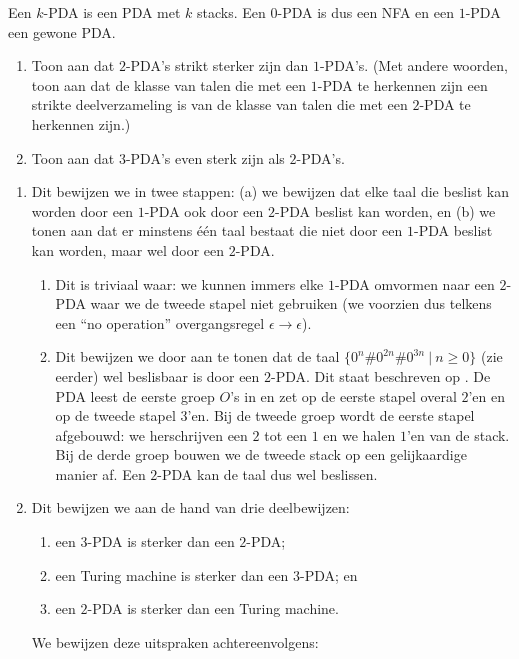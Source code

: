 \documentclass[a4paper]{article}
\begin{document}
\begin{question}
Een $k$-PDA is een PDA met $k$ stacks. Een $0$-PDA is dus een NFA en een $1$-PDA een gewone PDA. 
\begin{enumerate}
  \item Toon aan dat $2$-PDA's strikt sterker zijn dan $1$-PDA's. (Met andere woorden, toon aan dat de klasse van talen die met een $1$-PDA te herkennen zijn een strikte deelverzameling is van de klasse van talen die met een $2$-PDA te herkennen zijn.)
  \item Toon aan dat $3$-PDA's even sterk zijn als $2$-PDA's.
\end{enumerate}
\end{question}
\begin{answer}
\begin{enumerate}
\item Dit bewijzen we in twee stappen: (a) we bewijzen dat elke taal die beslist kan worden door een $1$-PDA ook door een $2$-PDA beslist kan worden, en (b) we tonen aan dat er minstens \'e\'en taal bestaat die niet door een $1$-PDA beslist kan worden, maar wel door een $2$-PDA.
\begin{enumerate}
 \item Dit is triviaal waar: we kunnen immers elke $1$-PDA omvormen naar een $2$-PDA waar we de tweede stapel niet gebruiken (we voorzien dus telkens een ``no operation'' overgangsregel $\epsilon\rightarrow\epsilon$).
 \item Dit bewijzen we door aan te tonen dat de taal $\{ 0^n\#0^{2n}\#0^{3n} \ | \ n \geq 0 \}$ (zie eerder) wel beslisbaar is door een $2$-PDA. Dit staat beschreven op \figref{}. De PDA leest de eerste groep $O$'s in en zet op de eerste stapel overal $2$'en en op de tweede stapel $3$'en. Bij de tweede groep wordt de eerste stapel afgebouwd: we herschrijven een $2$ tot een $1$ en we halen $1$'en van de stack. Bij de derde groep bouwen we de tweede stack op een gelijkaardige manier af. Een $2$-PDA kan de taal dus wel beslissen.
\end{enumerate}
\item Dit bewijzen we aan de hand van drie deelbewijzen:
\begin{enumerate}
 \item een $3$-PDA is sterker dan een $2$-PDA;
 \item een Turing machine is sterker dan een $3$-PDA; en
 \item een $2$-PDA is sterker dan een Turing machine.
\end{enumerate}
 We bewijzen deze uitspraken achtereenvolgens:

\end{enumerate}
\end{answer}
\end{document}
